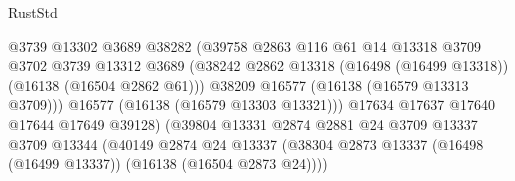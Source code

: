 \begin{lexlean}{RustStd}
\begin{coremodule}
                                            @3739
                                            @13302
                                            @3689
                                            @38282
                                            (@39758
                                              @2863
                                              @116
                                              @61
                                              @14
                                              @13318
                                              @3709
                                              @3702
                                              @3739
                                              @13312
                                              @3689
                                              (@38242
                                                @2862
                                                @13318
                                                (@16498 (@16499 @13318))
                                                (@16138 (@16504 @2862 @61)))
                                              @38209
                                              @16577
                                              (@16138 (@16579 @13313 @3709)))
                                            @16577
                                            (@16138 (@16579 @13303 @13321)))
                                          @17634
                                          @17637
                                          @17640
                                          @17644
                                          @17649
                                          @39128)
                                        (@39804
                                          @13331
                                          @2874
                                          @2881
                                          @24
                                          @3709
                                          @13337
                                          @3709
                                          @13344
                                          (@40149
                                            @2874
                                            @24
                                            @13337
                                            (@38304
                                              @2873
                                              @13337
                                              (@16498 (@16499 @13337))
                                              (@16138 (@16504 @2873 @24))))

\end{coremodule}
\end{lexlean}
